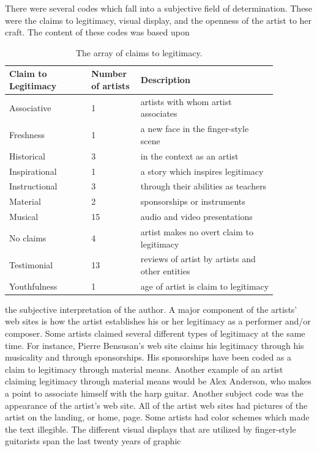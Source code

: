 \documentclass[nofonts,nobib]{tufte-handout}
\begin{document}
There were several codes which fall into a subjective field of
determination. These were the claims to legitimacy, visual display, and the
openness of the artist to her craft. The content of these codes was based upon
\begin{table}
  \centering
  \small
  \begin{tabular}{p{0.27\linewidth}p{0.15\linewidth}p{0.45\linewidth}}\toprule
    Claim to Legitimacy & Number of artists & Description \\\midrule
    Associative & 1 & artists with whom artist associates \\
    Freshness & 1 & a new face in the finger-style scene \\
    Historical & 3 & in the context as an artist \\
    Inspirational & 1 & a story which inspires legitimacy \\
    Instructional & 3 & through their abilities as teachers \\
    Material & 2 & sponsorships or instruments \\
    Musical & 15 & audio and video presentations \\
    No claims & 4 & artist makes no overt claim to legitimacy \\
    Testimonial & 13 & reviews of artist by artists and other entities \\
    Youthfulness & 1 & age of artist is claim to legitimacy \\
      \bottomrule
  \end{tabular}
  \caption{The array of claims to legitimacy.}
\end{table}
the subjective interpretation of the author. A major component of the artists' web sites is
how the artist establishes his or her legitimacy as a performer and/or
composer. Some artists claimed several different types of legitimacy at the
same time. For instance, Pierre Bensusan's web site claims his legitimacy
through his musicality and through sponsorships. His sponsorships have been
coded as a claim to legitimacy through material means. Another example of an
artist claiming legitimacy through material means would be Alex Anderson, who
makes a point to associate himself with the harp guitar. Another subject code
was the appearance of the artist's web site. All of the artist web sites had
pictures of the artist on the landing, or home, page. Some artists had color
schemes which made the text illegible. The different visual displays that are
utilized by finger-style guitarists span the last twenty years of graphic
\end{document}
